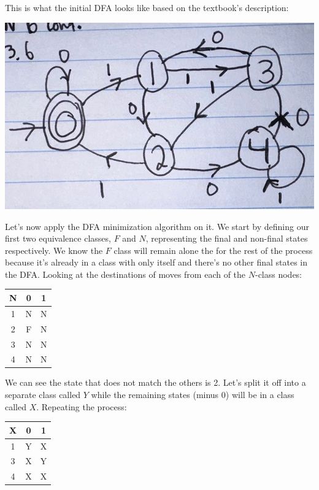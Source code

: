 \documentclass[12pt]{article}
\begin{document}
This is what the initial DFA looks like based on the textbook's description:

\begin{center}
\includegraphics[scale=.25]{14.3.6}
\end{center}

Let's now apply the DFA minimization algorithm on it. We start by defining our first two equivalence classes, $F$ and $N$, representing the final and non-final states respectively. We know the $F$ class will remain alone the for the rest of the process because it's already in a class with only itself and there's no other final states in the DFA. Looking at the destinations of moves from each of the $N$-class nodes:

\begin{center}
\begin{tabular}{c | c c}
N & 0 & 1 \\
\hline
1 & N & N \\
2 & F & N \\
3 & N & N \\
4 & N & N \\
\end{tabular}
\end{center}

We can see the state that does not match the others is 2. Let's split it off into a separate class called $Y$ while the remaining states (minus 0) will be in a class called $X$. Repeating the process:

\begin{center}
\begin{tabular}{c | c c}
X & 0 & 1 \\
\hline
1 & Y & X \\
3 & X & Y \\
4 & X & X \\
\end{tabular}
\end{center}
\end{document}
